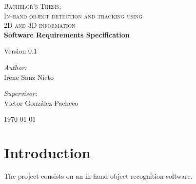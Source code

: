 \documentclass{article}
\begin{document}
\begin{titlepage}

\begin{center}
\textsc{\huge Bachelor's Thesis:\\[0.5cm]In-hand object detection and tracking using\\[0.5cm]2D and 3D
information }\\[4cm]


{\Huge\bfseries{Software Requirements Specification}\\[2cm]}

\Large{Version 0.1}
\\[11cm]


\begin{minipage}{0.55\textwidth}
\begin{flushleft} \large
\emph{Author:}\\
Irene Sanz Nieto\\
\end{flushleft}
\end{minipage}
\begin{minipage}{0.4\textwidth}
\begin{flushright} \large
\emph{Supervisor:}\\
Victor González Pacheco\end{flushright}\end{minipage}\vfill

{\large \today}

\end{center}
\end{titlepage}

%
\newpage
%
\tableofcontents
\newpage


\section{Introduction}
\hspace{0.5cm}The project consists on an in-hand object recognition software. 
\\
\end{document}
